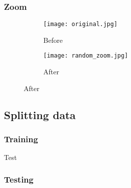 \subsubsection{Zoom}

\begin{figure}[H]
	\centering
	\begin{subfigure}{0.45\textwidth}
		\texttt{[image: original.jpg]}
		\caption{Before}
		\label{fig:original}
	\end{subfigure}
	\hfill
	\begin{subfigure}{0.45\textwidth}
		\texttt{[image: random\_zoom.jpg]}
		\caption{After}
		\label{fig:horizontal_flip}
	\end{subfigure}
	\label{fig:comparison}
\end{figure}

\subsection{Splitting data}

\subsubsection{Training}
Test

\subsubsection{Testing}


